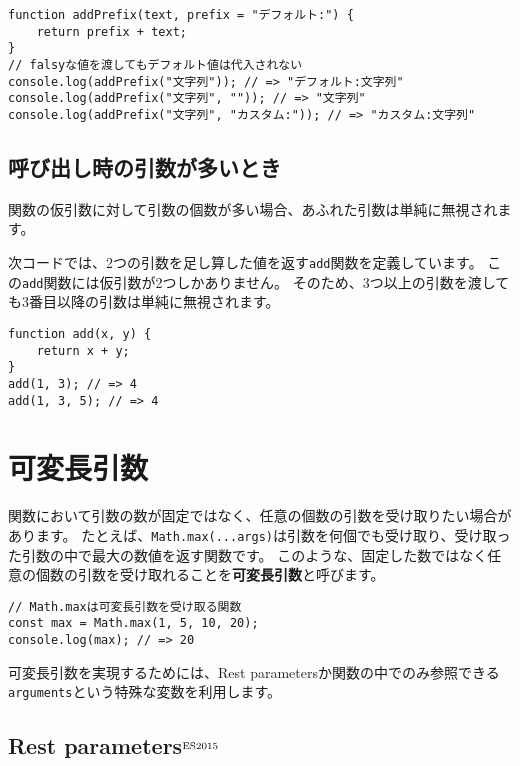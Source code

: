 \begin{lstlisting}
function addPrefix(text, prefix = "デフォルト:") {
    return prefix + text;
}
// falsyな値を渡してもデフォルト値は代入されない
console.log(addPrefix("文字列")); // => "デフォルト:文字列"
console.log(addPrefix("文字列", "")); // => "文字列"
console.log(addPrefix("文字列", "カスタム:")); // => "カスタム:文字列"
\end{lstlisting}

\hypertarget{function-more-arguments}{%
\subsection{呼び出し時の引数が多いとき}\label{function-more-arguments}}

関数の仮引数に対して引数の個数が多い場合、あふれた引数は単純に無視されます。

次コードでは、2つの引数を足し算した値を返す\texttt{add}関数を定義しています。
この\texttt{add}関数には仮引数が2つしかありません。
そのため、3つ以上の引数を渡しても3番目以降の引数は単純に無視されます。

\begin{lstlisting}
function add(x, y) {
    return x + y;
}
add(1, 3); // => 4
add(1, 3, 5); // => 4
\end{lstlisting}

\hypertarget{variable-arguments}{%
\section{可変長引数}\label{variable-arguments}}

関数において引数の数が固定ではなく、任意の個数の引数を受け取りたい場合があります。
たとえば、\texttt{Math.max(...args)}は引数を何個でも受け取り、受け取った引数の中で最大の数値を返す関数です。
このような、固定した数ではなく任意の個数の引数を受け取れることを\textbf{可変長引数}と呼びます。

\begin{lstlisting}
// Math.maxは可変長引数を受け取る関数
const max = Math.max(1, 5, 10, 20);
console.log(max); // => 20
\end{lstlisting}

可変長引数を実現するためには、Rest
parametersか関数の中でのみ参照できる\texttt{arguments}という特殊な変数を利用します。

\hypertarget{rest-parameters}{%
\subsection{Rest parameters{$^{\rm ES2015}$}}\label{rest-parameters}}

